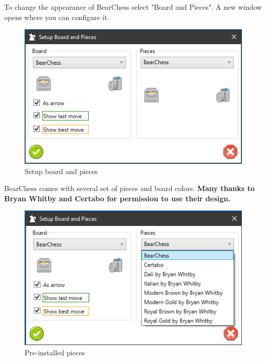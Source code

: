 \documentclass[11pt,a4paper]{article}
\begin{document}
To change the appearance of BearChess select "Board and Pieces". A new window opens where you can configure it. 

\begin{figure}[H]
	\centering
	\includegraphics[scale=0.9]{SettingsBoardAndPieces2.png}
	\caption{Setup board and pieces }
	\label{fig:SettingsBoardAndPieces2}
\end{figure}

BearChess comes with several set of pieces and board colors. \textbf{Many thanks to Bryan Whitby and Certabo for permission to use their design.}

\begin{figure}[H]
	\centering
	\includegraphics[scale=0.9]{SettingsBoardAndPieces3.png}
	\caption{Pre-installed pieces }
	\label{fig:SettingsBoardAndPieces3}
\end{figure}
\end{document}
